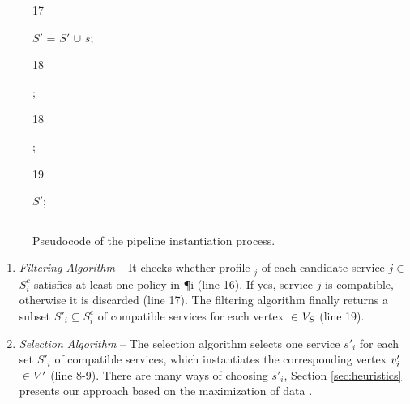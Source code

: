 \begin{figure}[!t]
\begin{ourcolor}
\begin{tabbing}
      \begin{redtext}17\end{redtext}\tabtwo $S'$ = $S'$ $\cup$ $s$;\\
      \begin{redtext}18\end{redtext}\tabone{};\\
      \begin{redtext}18\end{redtext};\\
      \begin{redtext}19\end{redtext} $S'$;\\
    \end{tabbing}
  \end{ourcolor}
  \hrule
  \vspace{10pt}
  \caption{\label{fig:instantiate-pseudocode} Pseudocode of the pipeline instantiation process.}
\end{figure}

\begin{enumerate}
  \item \textit{Filtering Algorithm} -- It checks whether profile \profile$_j$ of each candidate service $\si{j}$$\in$$S^c_{i}$ satisfies at least one policy in \P{i} {\color{OurColor}(line 16)}. If yes, service $\si{j}$ is compatible, otherwise it is discarded {\color{OurColor}(line 17)}. The filtering algorithm finally returns a subset $S'_{i}$$\subseteq$$S^c_{i}$ of compatible services for each vertex $\in$$V_S$ {\color{OurColor}(line 19)}.
  \item \textit{Selection Algorithm} -- The selection algorithm selects one service $s'_i$ for each set $S'_{i}$ of compatible services, which instantiates the corresponding vertex $v'_{i}$$\in$$V'$ {\color{OurColor}(line 8-9)}. There are many ways of choosing $s'_i$, Section \ref{sec:heuristics} presents our approach based on the maximization of data \quality \emph{\q}.
\end{enumerate}


